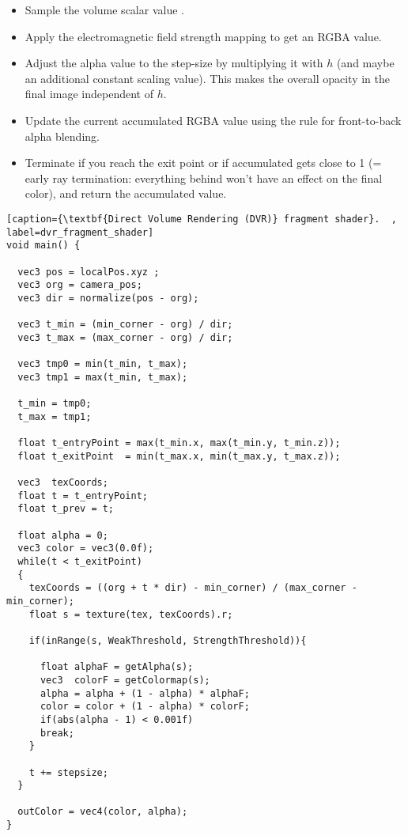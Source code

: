 \begin{itemize}
	\item Sample the volume scalar value .
	\item Apply the electromagnetic field strength mapping to get an RGBA value.
	\item Adjust the alpha value to the step-size by multiplying it with $h$ (and maybe an additional constant scaling value). This makes the overall opacity in the final image independent of $h$.
	\item Update the current accumulated RGBA value using the rule for front-to-back alpha blending.
	\item Terminate if you reach the exit point or if accumulated gets close to 1 (= early ray termination: everything behind won’t have an effect on the final color), and return the accumulated value.
\end{itemize}

\begin{lstlisting}[caption={\textbf{Direct Volume Rendering (DVR)} fragment shader}.  , label=dvr_fragment_shader]
void main() {

  vec3 pos = localPos.xyz ;
  vec3 org = camera_pos;
  vec3 dir = normalize(pos - org);

  vec3 t_min = (min_corner - org) / dir;
  vec3 t_max = (max_corner - org) / dir;

  vec3 tmp0 = min(t_min, t_max);
  vec3 tmp1 = max(t_min, t_max);

  t_min = tmp0;
  t_max = tmp1;

  float t_entryPoint = max(t_min.x, max(t_min.y, t_min.z));
  float t_exitPoint  = min(t_max.x, min(t_max.y, t_max.z));

  vec3  texCoords;
  float t = t_entryPoint;
  float t_prev = t;

  float alpha = 0;
  vec3 color = vec3(0.0f);
  while(t < t_exitPoint)
  {
    texCoords = ((org + t * dir) - min_corner) / (max_corner - min_corner);
    float s = texture(tex, texCoords).r;

    if(inRange(s, WeakThreshold, StrengthThreshold)){

      float alphaF = getAlpha(s);
      vec3  colorF = getColormap(s);
      alpha = alpha + (1 - alpha) * alphaF;
      color = color + (1 - alpha) * colorF;
      if(abs(alpha - 1) < 0.001f)
      break;
    }

    t += stepsize;
  }

  outColor = vec4(color, alpha);
}
\end{lstlisting}